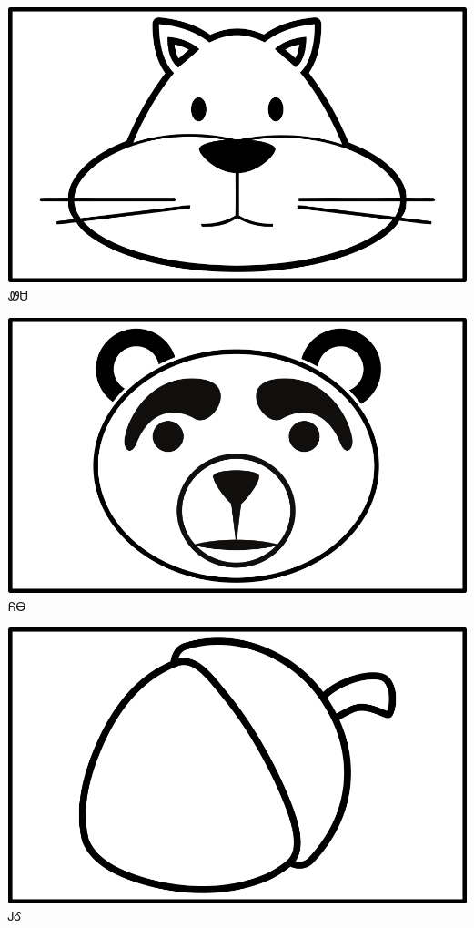 \documentclass[avery5371]{flashcards}%
\begin{document}
\begin{flashcard}{
\includegraphics[width=0.95\columnwidth,height=.51\columnwidth,keepaspectratio]{../artwork/objects-animate/wesa}
}
\Huge ᏪᏌ
\end{flashcard}

\begin{flashcard}{
\includegraphics[width=0.95\columnwidth,height=.51\columnwidth,keepaspectratio]{../artwork/objects-animate/yona}
}
\Huge ᏲᎾ
\end{flashcard}


\begin{flashcard}{
\includegraphics[width=0.95\columnwidth,height=.51\columnwidth,keepaspectratio]{../artwork/objects-neutral/gule}
}
\Huge ᎫᎴ
\end{flashcard}
\end{document}
